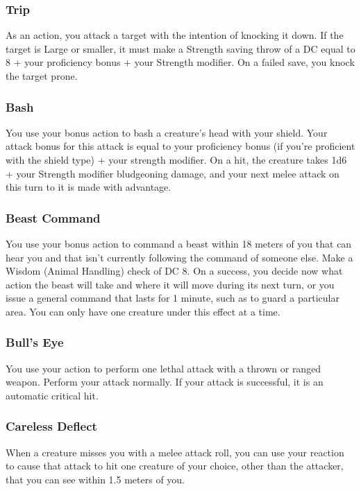 \subsubsection{Trip} \label{tec::trip}
As an action, you attack a target with the intention of knocking it down.
If the target is Large or smaller, it must make a Strength saving throw of a DC equal to 8 + your proficiency bonus + your Strength modifier.
On a failed save, you knock the target prone.

\subsubsection{Bash} \label{tec::bash}
You use your bonus action to bash a creature's head with your shield.
Your attack bonus for this attack is equal to your proficiency bonus (if you're proficient with the shield type) + your strength modifier.
On a hit, the creature takes 1d6 + your Strength modifier bludgeoning damage, and your next melee attack on this turn to it is made with advantage.

\subsubsection{Beast Command} \label{tec::beastcommand}
You use your bonus action to command a beast within 18 meters of you that can hear you and that isn't currently following the command of someone else.
Make a Wisdom (Animal Handling) check of DC 8.
On a success, you decide now what action the beast will take and where it will move during its next turn, or you issue a general command that lasts for 1 minute, such as to guard a particular area.
You can only have one creature under this effect at a time.

\subsubsection{Bull's Eye} \label{tec::bullseye}
You use your action to perform one lethal attack with a thrown or ranged weapon.
Perform your attack normally.
If your attack is successful, it is an automatic critical hit.

\subsubsection{Careless Deflect} \label{tec::carelessdeflect}
When a creature misses you with a melee attack roll, you can use your reaction to cause that attack to hit one creature of your choice, other than the attacker, that you can see within 1.5 meters of you.


